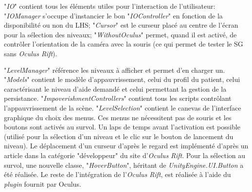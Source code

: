 		\begin{minipage}{\linewidth}
			\label{HierarchyLevelSelection}
		\end{minipage}\medskip
		
		"\textit{IO}" contient tous les éléments utiles pour l'interaction de l'utilisateur: "\textit{IOManager} s'occupe d'instancier le bon "\textit{IOController}" en fonction de la disponibilité ou non du LHS; "\textit{Cursor}" est le curseur placé au centre de l'écran pour la sélection des niveaux; "\textit{WithoutOculus}" permet, quand il est activé, de contrôler l'orientation de la caméra avec la souris (ce qui permet de tester le SG sans \textit{Oculus Rift}).
		
		"\textit{LevelManager}" référence les niveaux à afficher et permet d'en charger un. "\textit{Models}" contient le modèle d'appauvrissement, celui du profil du patient, celui caractérisant le niveau d'aide demandé et celui permettant la gestion de la persistance. "\textit{ImpoverishmentControllers}" contient tous les scripts contrôlant l'appauvrissement de la scène.
		"\textit{LevelSelection}" contient le canevas de l'interface graphique du choix des menus. Ces menus ne nécessitent pas de souris et les boutons sont activés au survol. Un laps de temps avant l'activation est possible (utilisé pour la sélection d'un niveau et le clic sur le bouton de lancement du niveau). Le déplacement d'un curseur d'après le regard est implémenté d'après un article \cite{UnityUISystemInVR} dans la catégorie "développeur" du site d'\textit{Oculus Rift}. Pour la sélection au survol, une nouvelle classe, "\textit{HoverButton}", héritant de \textit{UnityEngine.UI.Button} a été réalisée. Le reste de l'intégration de l'\textit{Oculus Rift}, est réalisée à l'aide du \textit{plugin} fournit par Oculus.
		

